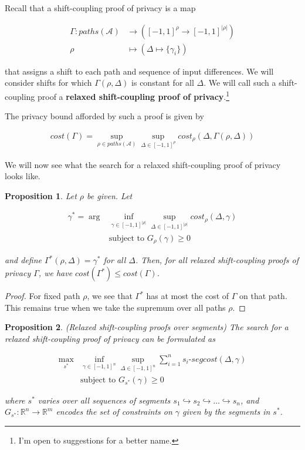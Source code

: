 \documentclass{article}
\newcommand{\R}{\mathbb{R}}
\newtheorem{proposition}{Proposition}[section]
\newcommand{\1}{\langle 1 \rangle}
\newcommand{\2}{\langle 2 \rangle}
\begin{document}
Recall that a shift-coupling proof of privacy is a map 

\begin{align*}
    \Gamma: paths(\mathcal{A}) &\to ([-1, 1]^{\rho} \to [-1, 1]^{|\rho|})\\
    \rho &\mapsto (\Delta \mapsto \{\gamma_i\})
\end{align*}

that assigns a shift to each path and sequence of input differences. We will consider shifts for which $\Gamma(\rho, \Delta)$ is constant for all $\Delta$. We will call such a shift-coupling proof a \textbf{relaxed shift-coupling proof of privacy}.\footnote{I'm open to suggestions for a better name.}

The privacy bound afforded by such a proof is given by

\begin{align*}
    cost(\Gamma) = \sup_{\rho \in paths(\mathcal{A})} \sup_{\Delta \in [-1, 1]^{\rho}} cost_{\rho}(\Delta, \Gamma(\rho, \Delta))
\end{align*}

We will now see what the search for a relaxed shift-coupling proof of privacy looks like.

\begin{proposition}
    \label{prop:relaxed_shifts}
    Let $\rho$ be given. Let 

    \begin{align*}
        \gamma^* = \arg &\inf_{\gamma \in [-1, 1]^{|\rho|}} \sup_{\Delta \in [-1, 1]^{|\rho|}} cost_{\rho}(\Delta, \gamma)\\
        &\text{subject to } G_{\rho}(\gamma) \geq 0
    \end{align*}

    and define $\Gamma^*(\rho, \Delta) = \gamma^*$ for all $\Delta$. Then, for all relaxed shift-coupling proofs of privacy $\Gamma$, we have $cost(\Gamma^*) \leq cost(\Gamma)$.
\end{proposition}

\begin{proof}
    For fixed path $\rho$, we see that $\Gamma^*$ has at most the cost of $\Gamma$ on that path. This remains true when we take the supremum over all paths $\rho$.
\end{proof}

\begin{proposition}
    (Relaxed shift-coupling proofs over segments) The search for a relaxed shift-coupling proof of privacy can be formulated as

    \begin{align*}
        \max_{s^*} &\inf_{\gamma \in [-1, 1]^n} \sup_{\Delta \in [-1, 1]^{n}}\sum_{i = 1}^n s_i\text{-}segcost(\Delta, \gamma) \\ 
        &\text{subject to } G_{s^*}(\gamma) \geq 0
    \end{align*}

    where $s^*$ varies over all sequences of segments $s_1 \hookrightarrow s_2 \hookrightarrow \dots \hookrightarrow s_n$, and $G_{s^*} : \R^n \to \R^m$ encodes the set of constraints on $\gamma$ given by the segments in $s^*$. 
\end{proposition}
\end{document}
